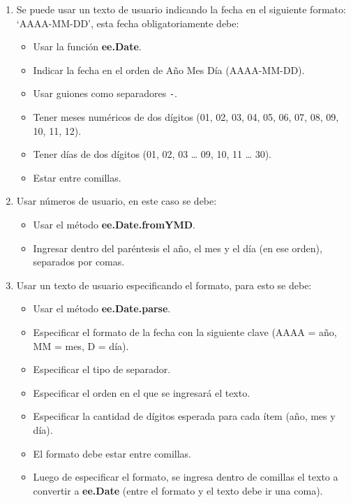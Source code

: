 \documentclass[
  12pt,
  letterpaper,
  twoside]{book}
\providecommand{\tightlist}{%
  \setlength{\itemsep}{0pt}\setlength{\parskip}{0pt}}
\newcommand\boldpurple[1]{\textcolor{darkpurple}{\textbf{#1}}}
\begin{document}
\begin{enumerate}
\def\labelenumi{\arabic{enumi}.}
\tightlist
\item
  Se puede usar un texto de usuario indicando la fecha en el siguiente formato: `AAAA-MM-DD', esta fecha obligatoriamente debe:

  \begin{itemize}
  \tightlist
  \item
    Usar la función \boldpurple{ee.Date}.
  \item
    Indicar la fecha en el orden de Año Mes Día (AAAA-MM-DD).
  \item
    Usar guiones como separadores \texttt{-}.
  \item
    Tener meses numéricos de dos dígitos (01, 02, 03, 04, 05, 06, 07, 08, 09, 10, 11, 12).
  \item
    Tener días de dos dígitos (01, 02, 03 \ldots{} 09, 10, 11 \ldots{} 30).
  \item
    Estar entre comillas.
  \end{itemize}
\item
  Usar números de usuario, en este caso se debe:

  \begin{itemize}
  \tightlist
  \item
    Usar el método \boldpurple{ee.Date.fromYMD}.
  \item
    Ingresar dentro del paréntesis el año, el mes y el día (en ese orden), separados por comas.
  \end{itemize}
\item
  Usar un texto de usuario especificando el formato, para esto se debe:

  \begin{itemize}
  \tightlist
  \item
    Usar el método \boldpurple{ee.Date.parse}.
  \item
    Especificar el formato de la fecha con la siguiente clave (AAAA = año, MM = mes, D = día).
  \item
    Especificar el tipo de separador.
  \item
    Especificar el orden en el que se ingresará el texto.
  \item
    Especificar la cantidad de dígitos esperada para cada ítem (año, mes y día).
  \item
    El formato debe estar entre comillas.
  \item
    Luego de especificar el formato, se ingresa dentro de comillas el texto a convertir a \boldpurple{ee.Date} (entre el formato y el texto debe ir una coma).
  \end{itemize}
\end{enumerate}
\end{document}
